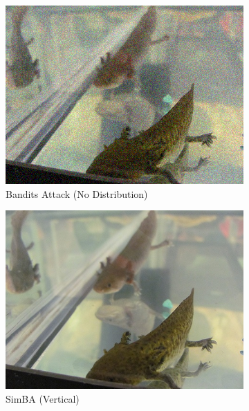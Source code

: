 \begin{figure}[tp]
\begin{subfigure}[t]{0.31\textwidth}
    \centering
    \includegraphics[width=\textwidth]{figures/chapter_classification/x_29_adv_bandits_1.jpg}
    \caption{Bandits Attack (No Distribution)}
    \label{fig:bandits_no_img}
\end{subfigure}
\hfill
\begin{subfigure}[t]{0.31\textwidth}
    \centering
    \includegraphics[width=\textwidth]{figures/chapter_classification/x_29_adv_simba_8.jpg}
    \caption{SimBA (Vertical)}
    \label{fig:simba_vertical_img}
\end{subfigure}
\hfill
\begin{subfigure}[t]{0.31\textwidth}
    \centering

\end{subfigure}
\end{figure}
